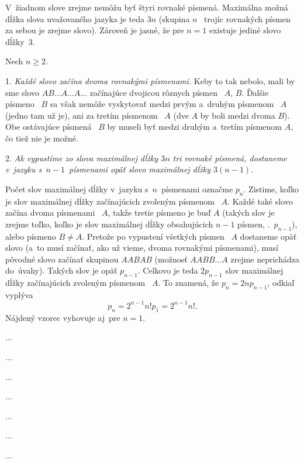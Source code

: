 {%
V~žiadnom slove zrejme nemôžu byť štyri rovnaké písmená. Maximálna
možná dĺžka slova uvažovaného jazyka je teda $3n$ (skupina
$n$~ trojíc rovnakých písmen za sebou je zrejme slovo). Zároveň je
jasné, že pre $n=1$ existuje jediné slovo dĺžky~3.

Nech $n\ge2$.

1. {\it Každé slovo začína dvoma rovnakými písmenami.\/} Keby to
tak nebolo, mali by sme slovo $AB\dots A\dots A\dots$ začínajúce
dvojicou rôznych písmen~ $A$, $B$. Ďalšie písmeno~ $B$ sa však
nemôže vyskytovať medzi prvým a~druhým písmenom~ $A$ (jedno tam už
je), ani za tretím písmenom~ $A$ (dve $A$ by boli medzi dvoma
$B$). Obe ostávajúce písmená~ $B$ by museli byť medzi druhým
a~tretím písmenom $A$, čo tiež nie je možné.

2. {\it Ak vypustíme zo slova maximálnej dĺžky $3n$ tri rovnaké
písmená, dostaneme v~jazyku s~$n-1$~písmenami opäť slovo maximálnej
dĺžky $3(n-1)$.}

Počet slov maximálnej dĺžky v~jazyku s~$n$~písmenami označme $p_n$.
Zistime, koľko je slov maximálnej dĺžky začínajúcich zvoleným
písmenom~ $A$. Každé také slovo začína dvoma písmenami~ $A$,
takže tretie písmeno je buď $A$ (takých slov je zrejme
toľko, koľko je slov maximálnej dĺžky obsahujúcich $n-1$ písmen,
\tj.~$p_{n-1}$), alebo písmeno $B\ne A$. Pretože po vypustení všetkých
písmen~ $A$ dostaneme opäť slovo (a~to musí začínať, ako už vieme,
dvoma rovnakými písmenami), musí pôvodné slovo začínať skupinou
$AABAB$ (možnosť $AABB\dots A$ zrejme neprichádza do~úvahy).
Takých slov je opäť $p_{n-1}$.
Celkovo je teda $2p_{n-1}$
slov maximálnej dĺžky začínajúcich zvoleným písmenom~ $A$. To
znamená, že $p_n=2np_{n-1}$, odkiaľ vyplýva
$$
p_n=2^{n-1}n!p_1=2^{n-1}n!.
$$
Nájdený vzorec vyhovuje aj~pre $n=1$.
}

{%
...}

{%
...}

{%
...}

{%
...}

{%
...}

{%
...}

{%
...}

